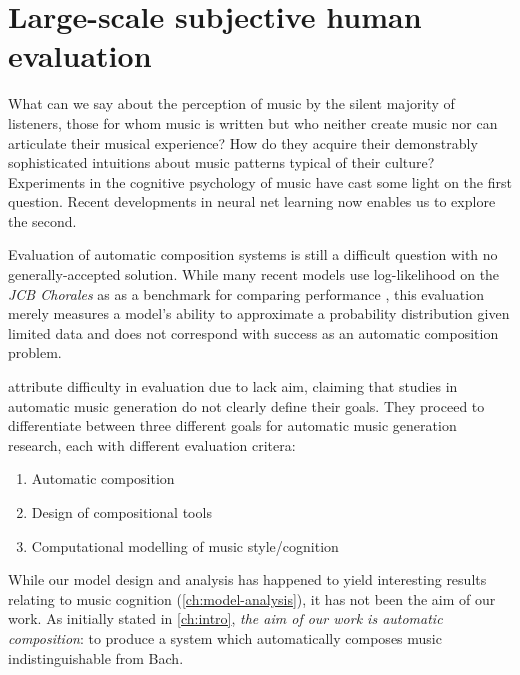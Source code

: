 \chapter{Large-scale subjective human evaluation}\label{ch:evaluation}
\begin{savequote}[75mm]
  What can we say about the perception of music by the silent majority of
  listeners, those for whom music is written but who neither create music nor
  can articulate their musical experience? How do they acquire their
  demonstrably sophisticated intuitions about music patterns
  typical of their culture? Experiments in the cognitive psychology of music
  have cast some light on the first question. Recent developments in neural net learning
  now enables us to explore the second.
\end{savequote}


\ifpdf
    \graphicspath{{Chapter7/Figs/Raster/}{Chapter7/Figs/PDF/}{Chapter7/Figs/}}
\else
    \graphicspath{{Chapter7/Figs/Vector/}{Chapter7/Figs/}}
\fi

Evaluation of automatic composition systems is still a difficult question with
no generally-accepted solution. While many recent models use log-likelihood on
the \textit{JCB Chorales} \citep{Allan2005} as as a benchmark for comparing
performance
\citep{Boulanger-Lewandowski2012,bayer2013fast,pascanu2013construct,goel2014polyphonic,zaremba2015empirical,Lyu2015},
this evaluation merely measures a model's ability to approximate a probability
distribution given limited data and does not correspond with success as an
automatic composition problem.

\citet{pearce2001towards,pearce2002motivations} attribute difficulty in
evaluation due to lack aim, claiming that studies in automatic music generation
do not clearly define their goals. They proceed to differentiate between three
different goals for automatic music generation research, each with different
evaluation critera:
\begin{enumerate}
  \item Automatic composition
  \item Design of compositional tools
  \item Computational modelling of music style/cognition
\end{enumerate}

While our model design and analysis has happened to yield interesting results
relating to music cognition (\cref{ch:model-analysis}), it has not been the aim
of our work. As initially stated in \cref{ch:intro}, \emph{the aim of our work is
automatic composition}: to produce a system which automatically composes music
indistinguishable from Bach.

